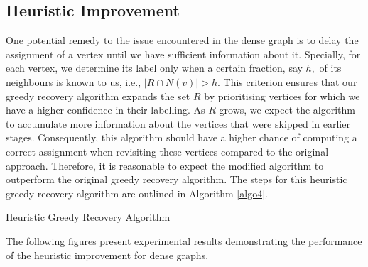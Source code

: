 \subsection{Heuristic Improvement}
One potential remedy to the issue encountered in the dense graph is to delay the assignment of a vertex until we have sufficient information about it. Specially, for each vertex,  we determine its label only when a certain fraction, say $h,$  of its neighbours is known to us, i.e., $|R\cap N(v)|>h.$ This criterion ensures that our greedy recovery algorithm expands the set $R$ by prioritising vertices for which we have a higher confidence in their labelling. As $R$ grows, we expect the algorithm to accumulate more information about the vertices that were skipped in earlier stages. Consequently, this algorithm should have a higher chance of computing a correct assignment when revisiting these vertices compared to the original approach. Therefore, it is reasonable to expect the modified algorithm to outperform the original greedy recovery algorithm. The steps for this heuristic greedy recovery algorithm are outlined in Algorithm \ref{algo4}.
\clearpage
\begin{algorithm}[H]\label{algo4}
\BlankLine
\caption{Heuristic Greedy Recovery Algorithm}
\end{algorithm}
\clearpage
The following figures present experimental results demonstrating the performance of the heuristic improvement for dense graphs. 
